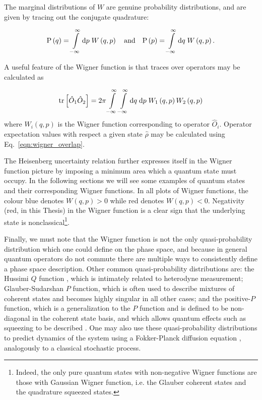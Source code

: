 \noindent The marginal distributions of $W$ are genuine probability distributions, and are given by tracing out the conjugate quadrature:

\begin{equation}
\text{P}\left(q\right) = \int\limits_{-\infty}^\infty \mathrm{d}p \; W\left(q, p\right) \qq{and} \text{P}\left(p\right) = \int\limits_{-\infty}^\infty \mathrm{d}q \; W\left(q, p\right).
\end{equation}

\noindent A useful feature of the Wigner function is that traces over operators may be calculated as

\begin{equation}\label{eqn:wigner_overlap}
\tr\left[\hat{O}_1 \hat{O}_2\right] = 2\pi \int\limits_{-\infty}^\infty \int\limits_{-\infty}^{\infty} \mathrm{d}q \; \mathrm{d}p \; W_1\left(q, p\right) W_2\left(q, p\right)
\end{equation}
where $W_i\left(q, p\right)$ is the Wigner function corresponding to operator $\hat{O}_i$. Operator expectation values with respect a given state $\hat{\rho}$ may be calculated using Eq.~\ref{eqn:wigner_overlap}. 

The Heisenberg uncertainty relation further expresses itself in the Wigner function picture by imposing a minimum area which a quantum state must occupy. In the following sections we will see some examples of quantum states and their corresponding Wigner functions. In all plots of Wigner functions, the colour blue denotes $W\left(q, p\right) >0$ while red denotes $W \left(q, p\right) <0$. Negativity (red, in this Thesis) in the Wigner function is a clear sign that the underlying state is nonclassical\footnote{Indeed, the only pure quantum states with non-negative Wigner functions are those with Gaussian Wigner function, i.e. the Glauber coherent states and the quadrature squeezed states.}.



Finally, we must note that the Wigner function is not the only quasi-probability distribution which one could define on the phase space, and because in general quantum operators do not commute there are multiple ways to consistently define a phase space description. Other common quasi-probability distributions are: the Hussimi $Q$ function \cite{Husimi1940}, which is intimately related to heterodyne measurement; Glauber-Sudarshan \cite{Glauber1963} $P$ function, which is often used to describe mixtures of coherent states and becomes highly singular in all other cases; and the positive-$P$ function, which is a generalization to the $P$ function and is defined to be non-diagonal in the coherent state basis, and which allows quantum effects such as squeezing to be described \cite{Walls_Millburn_Textbook}. One may also use these quasi-probability distributions to predict dynamics of the system using a Fokker-Planck diffusion equation \cite{Carmichael1999}, analogously to a classical stochastic process.

